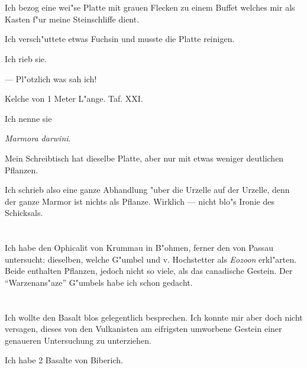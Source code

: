 \documentclass[a4paper, 11pt, oneside, german]{article}
\begin{document}
\section{}
\paragraph{}
Ich bezog eine wei"se Platte mit grauen Flecken zu einem Buffet welches mir als Kasten f"ur meine Steinschliffe dient.

Ich versch"uttete etwas Fuchsin und musste die Platte reinigen.

Ich rieb sie.

--- Pl"otzlich was sah ich!

Kelche von 1 Meter L"ange. Taf. XXI.

Ich nenne sie

\emph{Marmora darwini}.

Mein Schreibtisch hat dieselbe Platte, aber nur mit etwas weniger deutlichen Pflanzen.

Ich schrieb also eine ganze Abhandlung "uber die Urzelle auf der Urzelle, denn der ganze Marmor ist nichts als Pflanze. Wirklich --- nicht blo"s Ironie des Schicksals.
\clearpage
\section{}
\paragraph{}
Ich habe den Ophicalit von Krummau in B"ohmen, ferner den von Passau untersucht: dieselben, welche G"umbel und v. Hochstetter als \emph{Eozoon} erkl"arten. Beide enthalten Pflanzen, jedoch nicht so viele, als das canadische Gestein. Der "`Warzenans"aze"' G"umbels habe ich schon gedacht.
\clearpage
\section{}
\paragraph{}
Ich wollte den Basalt blos gelegentlich besprechen. Ich konnte mir aber doch nicht versagen, dieses von den Vulkanisten am eifrigsten umworbene Gestein einer genaueren Untersuchung zu unterziehen.

Ich habe 2 Basalte von Biberich.
\end{document}
